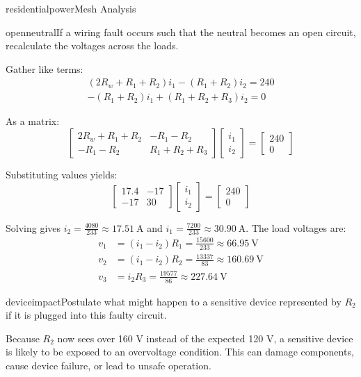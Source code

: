 \begin{mainquestion}{residentialpower}{Mesh Analysis}
\begin{partquestion}{openneutral}{If a wiring fault occurs such that the neutral becomes an open circuit, recalculate the voltages across the loads.}
\begin{answer}
Gather like terms:
\begin{gather*}
(2R_w + R_1 + R_2)i_1 - (R_1 + R_2)i_2 = 240 \\
- (R_1 + R_2)i_1 + (R_1 + R_2 + R_3)i_2 = 0
\end{gather*}

As a matrix:
\[
\begin{bmatrix}
2R_w + R_1 + R_2 & -R_1 -R_2\\
-R_1 -R_2 & R_1 + R_2 + R_3
\end{bmatrix}
\begin{bmatrix}
i_1 \\
i_2
\end{bmatrix}
=
\begin{bmatrix}
240 \\
0
\end{bmatrix}
\]

Substituting values yields:
\[
\begin{bmatrix}
17.4 & -17\\
-17 & 30
\end{bmatrix}
\begin{bmatrix}
i_1 \\
i_2
\end{bmatrix}
=
\begin{bmatrix}
240 \\
0
\end{bmatrix}
\]

Solving gives $i_{2} = \frac{4080}{233} \approx 17.51~\text{A}$ and $i_{1} = \frac{7200}{233} \approx 30.90~\text{A}$. The load voltages are:
\begin{align*}
v_{1} &= (i_{1}-i_{2})R_1 = \frac{15600}{233} \approx 66.95~\text{V} \\
v_{2} &= (i_{1}-i_{2})R_2 = \frac{13337}{83} \approx 160.69~\text{V} \\
v_{3} &= i_{2} R_3 = \frac{19577}{86} \approx 227.64~\text{V}
\end{align*}
\end{answer}
\end{partquestion}

\begin{partquestion}{deviceimpact}{Postulate what might happen to a sensitive device represented by $R_{2}$ if it is plugged into this faulty circuit.}
\begin{answer}
Because $R_{2}$ now sees over 160 V instead of the expected 120 V, a sensitive device is likely to be exposed to an overvoltage condition. This can damage components, cause device failure, or lead to unsafe operation.
\end{answer}
\end{partquestion}

\end{mainquestion}
